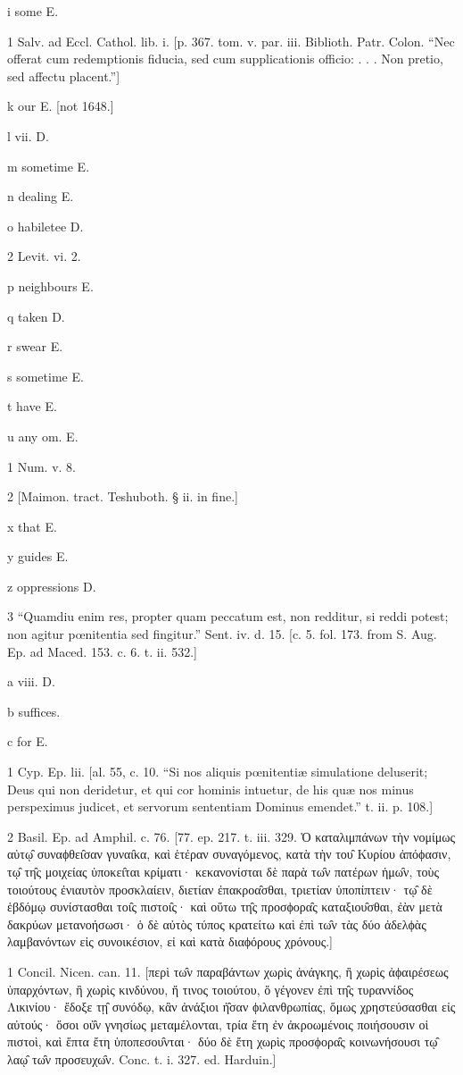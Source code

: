i
some E.

1
Salv. ad Eccl. Cathol. lib. i. [p. 367. tom. v. par. iii. Biblioth. Patr. Colon. “Nec offerat cum redemptionis fiducia, sed cum supplicationis officio: . . . Non pretio, sed affectu placent.”]

k
our E. [not 1648.]

l
vii. D.

m
sometime E.

n
dealing E.

o
habiletee D.

2
Levit. vi. 2.

p
neighbours E.

q
taken D.

r
swear E.

s
sometime E.

t
have E.

u
any om. E.

1
Num. v. 8.

2
[Maimon. tract. Teshuboth. § ii. in fine.]

x
that E.

y
guides E.

z
oppressions D.

3
“Quamdiu enim res, propter quam peccatum est, non redditur, si reddi potest; non agitur pœnitentia sed fingitur.” Sent. iv. d. 15. [c. 5. fol. 173. from S. Aug. Ep. ad Maced. 153. c. 6. t. ii. 532.]

a
viii. D.

b
suffices.

c
for E.

1
Cyp. Ep. lii. [al. 55, c. 10. “Si nos aliquis pœnitentiæ simulatione deluserit; Deus qui non deridetur, et qui cor hominis intuetur, de his quæ nos minus perspeximus judicet, et servorum sententiam Dominus emendet.” t. ii. p. 108.]

2
Basil. Ep. ad Amphil. c. 76. [77. ep. 217. t. iii. 329. Ὁ καταλιμπάνων τὴν νομίμως αὐτῳ̑ συναϕθει̑σαν γυναι̑κα, καὶ ἑτέραν συναγόμενος, κατὰ τὴν του̑ Κυρίου ἀπόϕασιν, τῳ̑ τη̑ς μοιχείας ὑποκει̑ται κρίματι· κεκανονίσται δὲ παρὰ τω̑ν πατέρων ἡμω̑ν, τοὺς τοιούτους ἐνιαυτὸν προσκλαίειν, διετίαν ἐπακροα̑σθαι, τριετίαν ὑποπίπτειν· τῳ̑ δὲ ἑβδόμῳ συνίστασθαι τοι̑ς πιστοι̑ς· καὶ οὕτω τη̑ς προσϕορα̑ς καταξιου̑σθαι, ἐὰν μετὰ δακρύων μετανοήσωσι· ὁ δὲ αὐτὸς τύπος κρατείτω καὶ ἐπὶ τω̑ν τὰς δύο ἀδελϕὰς λαμβανόντων εἰς συνοικέσιον, εἰ καὶ κατὰ διαϕόρους χρόνους.]

1
Concil. Nicen. can. 11. [περὶ τω̑ν παραβάντων χωρὶς ἀνάγκης, ἢ χωρὶς ἀϕαιρέσεως ὑπαρχόντων, ἢ χωρὶς κινδύνου, ἤ τινος τοιούτου, ὅ γέγονεν ἐπὶ τη̑ς τυραννίδος Λικινίου· ἔδοξε τῃ̑ συνόδῳ, κἂν ἀνάξιοι ἠ̑σαν ϕιλανθρωπίας, ὅμως χρηστεύσασθαι εἰς αὐτούς· ὅσοι οὐ̑ν γνησίως μεταμέλονται, τρία ἔτη ἐν ἀκροωμένοις ποιήσουσιν οἱ πιστοὶ, καὶ ἕπτα ἔτη ὑποπεσου̑νται· δύο δὲ ἔτη χωρὶς προσϕορα̑ς κοινωνήσουσι τῳ̑ λαῳ̑ τω̑ν προσευχω̑ν. Conc. t. i. 327. ed. Harduin.]

